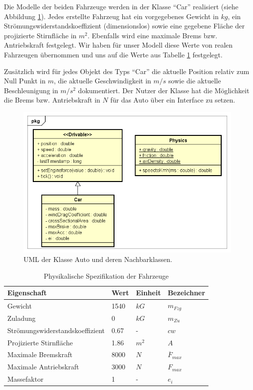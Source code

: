 \documentclass[12pt,a4paper,bibliography=totocnumbered,listof=totocnumbered, abstracton]{scrartcl}
\theoremstyle{Umgebung}
\begin{document}
Die Modelle der beiden Fahrzeuge werden in der Klasse \enquote{Car} realisiert (siehe Abbildung \ref{fig:car}). Jedes erstellte Fahrzeug hat ein vorgegebenes Gewicht in $kg$, ein Strömungswiderstandskoeffizient (dimensionslos) sowie eine gegebene Fläche der projizierte Stirnfläche in $m^2$. Ebenfalls wird eine maximale Brems bzw. Antriebskraft festgelegt. Wir haben für unser Modell diese Werte von realen Fahrzeugen übernommen und uns auf die Werte aus Tabelle \ref{table:car} festgelegt.

Zusätzlich wird für jedes Objekt des Typs \enquote{Car} die aktuelle Position relativ zum Null Punkt in $m$, die aktuelle Geschwindigkeit in $m/s$ sowie  die aktuelle Beschleunigung in $m/s^2$ dokumentiert. Der Nutzer der Klasse hat die Möglichkeit die Brems bzw. Antriebskraft in $N$ für das Auto über ein Interface zu setzen.

\begin{figure}
	\centering
	\includegraphics[width=0.7\linewidth]{img/practical/car-diagram}
	\caption{UML der Klasse Auto und deren Nachbarklassen.}
	\label{fig:car}
\end{figure}

\begin{table}[]
	\centering
	\caption{Physikalische Spezifikation der Fahrzeuge}
	\label{table:car}
	\begin{tabular}{@{}llll@{}}
		\toprule
		Eigenschaft                     & Wert & Einheit & Bezeichner           \\ \midrule
		Gewicht                         & 1540 & $kG$    & $m_{Fzg}$            \\
		Zuladung                        & 0    & $kG$    & $m_{Zu}$             \\
		Strömungswiderstandskoeffizient & 0.67 & -       & $cw$                 \\
		Projizierte Stirnfläche         & 1.86 & $m^2$   & $A$                  \\
		Maximale Bremskraft             & 8000 & $N$     & $\overline{F}_{max}$ \\
		Maximale Antriebskraft          & 3000 & $N$     & $ {F}_{max} $        \\
		Massefaktor                     & 1    & -       & $ {e}_{i} $          \\ \bottomrule
	\end{tabular}
\end{table}
\end{document}
